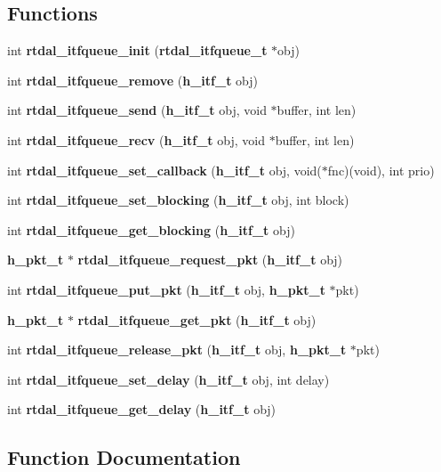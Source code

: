 \subsection*{Functions}
\begin{DoxyCompactItemize}
\item 
int {\bf rtdal\-\_\-itfqueue\-\_\-init} ({\bf rtdal\-\_\-itfqueue\-\_\-t} $\ast$obj)
\item 
int {\bf rtdal\-\_\-itfqueue\-\_\-remove} ({\bf h\-\_\-itf\-\_\-t} obj)
\item 
int {\bf rtdal\-\_\-itfqueue\-\_\-send} ({\bf h\-\_\-itf\-\_\-t} obj, void $\ast$buffer, int len)
\item 
int {\bf rtdal\-\_\-itfqueue\-\_\-recv} ({\bf h\-\_\-itf\-\_\-t} obj, void $\ast$buffer, int len)
\item 
int {\bf rtdal\-\_\-itfqueue\-\_\-set\-\_\-callback} ({\bf h\-\_\-itf\-\_\-t} obj, void($\ast$fnc)(void), int prio)
\item 
int {\bf rtdal\-\_\-itfqueue\-\_\-set\-\_\-blocking} ({\bf h\-\_\-itf\-\_\-t} obj, int block)
\item 
int {\bf rtdal\-\_\-itfqueue\-\_\-get\-\_\-blocking} ({\bf h\-\_\-itf\-\_\-t} obj)
\item 
{\bf h\-\_\-pkt\-\_\-t} $\ast$ {\bf rtdal\-\_\-itfqueue\-\_\-request\-\_\-pkt} ({\bf h\-\_\-itf\-\_\-t} obj)
\item 
int {\bf rtdal\-\_\-itfqueue\-\_\-put\-\_\-pkt} ({\bf h\-\_\-itf\-\_\-t} obj, {\bf h\-\_\-pkt\-\_\-t} $\ast$pkt)
\item 
{\bf h\-\_\-pkt\-\_\-t} $\ast$ {\bf rtdal\-\_\-itfqueue\-\_\-get\-\_\-pkt} ({\bf h\-\_\-itf\-\_\-t} obj)
\item 
int {\bf rtdal\-\_\-itfqueue\-\_\-release\-\_\-pkt} ({\bf h\-\_\-itf\-\_\-t} obj, {\bf h\-\_\-pkt\-\_\-t} $\ast$pkt)
\item 
int {\bf rtdal\-\_\-itfqueue\-\_\-set\-\_\-delay} ({\bf h\-\_\-itf\-\_\-t} obj, int delay)
\item 
int {\bf rtdal\-\_\-itfqueue\-\_\-get\-\_\-delay} ({\bf h\-\_\-itf\-\_\-t} obj)
\end{DoxyCompactItemize}


\subsection{Function Documentation}
